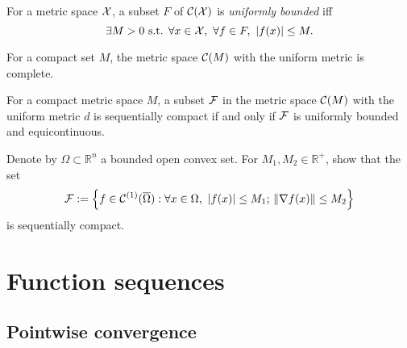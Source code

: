 \begin{defn}
  \label{def:uniformBoundedSetInFuncMetricSpace}
  For a metric space ${\cal X}$, 
  a subset $F$ of ${\cal C}({\cal X})$ is \emph{uniformly bounded}
  iff
  \begin{equation}
    \label{eq:uniformBoundedSetInFuncMetricSpace}
    \exists M>0 \text{ s.t. }
    \forall x\in {\cal X},\ \forall f \in F,\ 
    |f(x)| \le M.
  \end{equation}
\end{defn}

\begin{lem}
  \label{lem:completeMetricSpaceForCompactSet}
  For a compact set $M$,
  the metric space ${\cal C}(M)$
  with the uniform metric is complete.
\end{lem}

\begin{thm}
  \label{thm:Ascoli-Arzela}
  For a compact metric space $M$, %
  a subset ${\cal F}$ in the metric space ${\cal C}(M)$
  with the uniform metric $d$ is sequentially compact
  if and only if ${\cal F}$ is uniformly bounded and equicontinuous. 
\end{thm}


\begin{exc}
  \label{exc:equiContInRn2Compact}
  Denote by $\Omega\subset \mathbb{R}^n$ a bounded open convex set.
  For $M_1,M_2\in\mathbb{R}^+$,
  show that the set
  \begin{equation}
    \label{eq:equiContInRn2Compact}
    {\cal F} := \left\{f\in {\cal C}^{(1)}(\overline{\Omega}) :
      \forall x\in \Omega,\ |f(x)|\le M_1;\, 
      \|\nabla f(x)\|\le M_2
    \right\}
  \end{equation}
  is sequentially compact.
\end{exc}


\section{Function sequences}
\label{sec:uniform-convergence}

\subsection{Pointwise convergence}

